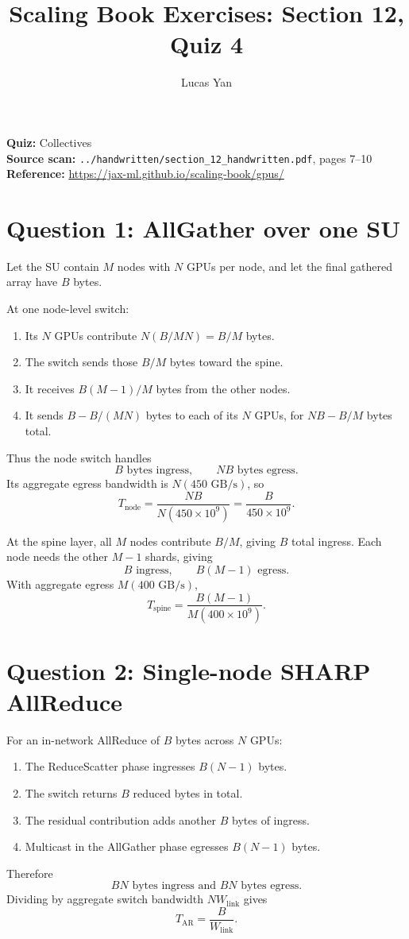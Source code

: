 \documentclass[11pt]{article}
\title{Scaling Book Exercises: Section 12, Quiz 4}
\author{Lucas Yan}
\date{}
\begin{document}
\maketitle

\noindent
\textbf{Quiz:} Collectives\\
\textbf{Source scan:} \texttt{../handwritten/section\_12\_handwritten.pdf},
pages 7--10\\
\textbf{Reference:} \url{https://jax-ml.github.io/scaling-book/gpus/}

\section*{Question 1: AllGather over one SU}

Let the SU contain \(M\) nodes with \(N\) GPUs per node, and let the final
gathered array have \(B\) bytes.

At one node-level switch:
\begin{enumerate}[label=\arabic*.]
  \item Its \(N\) GPUs contribute \(N(B/MN)=B/M\) bytes.
  \item The switch sends those \(B/M\) bytes toward the spine.
  \item It receives \(B(M-1)/M\) bytes from the other nodes.
  \item It sends \(B-B/(MN)\) bytes to each of its \(N\) GPUs, for
  \(NB-B/M\) bytes total.
\end{enumerate}
Thus the node switch handles
\[
\boxed{B\text{ bytes ingress},\qquad NB\text{ bytes egress}.}
\]
Its aggregate egress bandwidth is \(N(450\text{ GB/s})\), so
\[
\boxed{T_{\mathrm{node}}=\frac{NB}{N(450\times10^9)}
=\frac{B}{450\times10^9}.}
\]

At the spine layer, all \(M\) nodes contribute \(B/M\), giving \(B\)
total ingress.  Each node needs the other \(M-1\) shards, giving
\[
\boxed{B\text{ ingress},\qquad B(M-1)\text{ egress}.}
\]
With aggregate egress \(M(400\text{ GB/s})\),
\[
\boxed{
T_{\mathrm{spine}}
=\frac{B(M-1)}{M(400\times10^9)}.}
\]

\section*{Question 2: Single-node SHARP AllReduce}

For an in-network AllReduce of \(B\) bytes across \(N\) GPUs:
\begin{enumerate}[label=\arabic*.]
  \item The ReduceScatter phase ingresses \(B(N-1)\) bytes.
  \item The switch returns \(B\) reduced bytes in total.
  \item The residual contribution adds another \(B\) bytes of ingress.
  \item Multicast in the AllGather phase egresses \(B(N-1)\) bytes.
\end{enumerate}
Therefore
\[
\boxed{BN\text{ bytes ingress and }BN\text{ bytes egress}.}
\]
Dividing by aggregate switch bandwidth \(NW_{\mathrm{link}}\) gives
\[
\boxed{T_{\mathrm{AR}}=\frac{B}{W_{\mathrm{link}}}.}
\]
\end{document}

